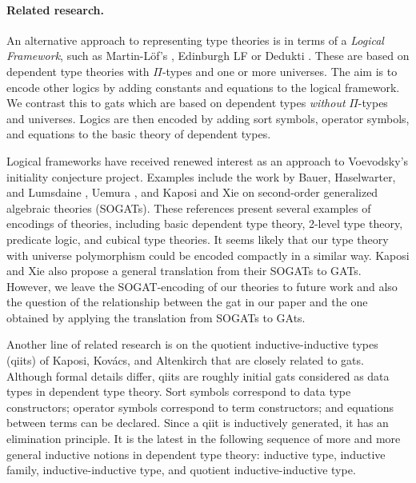 \documentclass[submission,copyright,creativecommons]{eptcs}
\begin{document}

%
\paragraph{Related research.}
An alternative approach to representing type theories is in terms of a {\em Logical Framework}, such as Martin-Löf's
\cite{nordstrom:book}, Edinburgh LF \cite{harper-honsell-plotkin} or Dedukti \cite{dowek-dedukti}. These are based on dependent type theories with $\Pi$-types and one or more universes. The aim is to encode other logics by adding constants and equations to the logical framework. We contrast this to gats which are based on dependent types {\em without} $\Pi$-types and universes. Logics are then encoded by adding sort symbols, operator symbols, and equations to the basic theory of dependent types.

Logical frameworks have received renewed interest as an approach to Voevodsky's initiality conjecture project. Examples include the work by Bauer, Haselwarter, and Lumsdaine \cite{BauerHL20}, Uemura \cite{Uemura23}, and Kaposi and Xie \cite{kaposi:sogat} on second-order generalized algebraic theories (SOGATs). These references present several examples of encodings of theories, including basic dependent type theory, 2-level type theory, predicate logic, and cubical type theories. It seems likely that our type theory with universe polymorphism could be encoded compactly in a similar way. Kaposi and Xie also propose a general translation from their SOGATs to GATs. However, we leave the SOGAT-encoding of our theories to future work and also the question of the relationship between the gat in our paper and the one obtained by applying the translation from SOGATs to GAts.

Another line of related research is on the quotient inductive-inductive types (qiits) of Kaposi, Kov{\'{a}}cs, and Altenkirch \cite{kaposi:qiits,kovacs:phd} that are closely related to gats. Although formal details differ, qiits are roughly initial gats considered as data types in dependent type theory. Sort symbols correspond to data type constructors; operator symbols correspond to term constructors; and equations between terms can be declared. Since a qiit is inductively generated, it has an elimination principle. It is the latest in the following sequence of more and more general inductive notions in dependent type theory: inductive type, inductive family, inductive-inductive type, and quotient inductive-inductive type.
\end{document}
